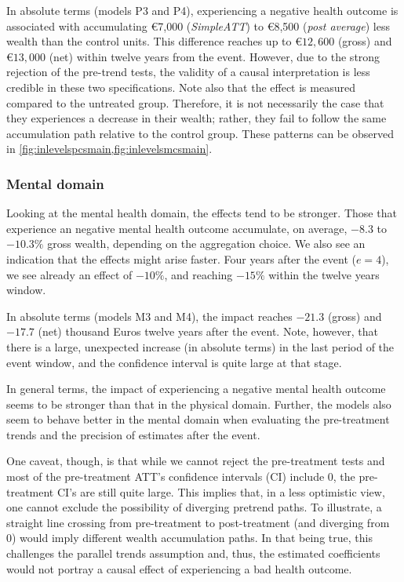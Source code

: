 In absolute terms (models P3 and P4), experiencing a negative health outcome is associated with accumulating
€7,000 (\textit{SimpleATT}) to €8,500 (\textit{post average}) less wealth than the control units.  This
difference reaches up to $€12,600$ (gross) and $€13,000$ (net) within twelve years from the event.
However, due to the strong rejection of the pre-trend tests, the validity of a causal interpretation is less
credible in these two specifications. Note also that the effect is measured compared to the untreated group.
Therefore, it is not necessarily the case that they experiences a decrease in their wealth; rather, they fail
to follow the same accumulation path relative to the control group. These patterns can be observed in
\cref{fig:inlevelspcsmain,fig:inlevelsmcsmain}.

 

\subsubsection{Mental domain}%
%
Looking at the mental health domain, the effects tend to be stronger. Those that experience an negative mental
health outcome accumulate, on average, $-8.3$ to $-10.3\%$ gross wealth, depending on the aggregation choice.
We also see an indication that the effects might arise faster. Four years after the event ($e=4$), we see
already an effect of $-10\%$, and reaching $-15\%$ within the twelve years window.

In absolute terms (models M3 and M4), the impact reaches $-21.3$ (gross) and $-17.7$ (net) thousand Euros
twelve years after the event. Note, however, that there is a large, unexpected increase (in absolute terms) in
the last period of the event window, and the confidence interval is quite large at that stage.

In general terms, the impact of experiencing a negative mental health outcome seems to be stronger than that in
the physical domain. Further, the models also seem to behave better in the mental domain when evaluating 
the pre-treatment trends and the precision of estimates after the event. 

One caveat, though, is that while we cannot reject the pre-treatment tests and most of the pre-treatment ATT's
confidence intervals (CI) include 0, the pre-treatment CI's are still quite large. This implies that, in a less
optimistic view, one cannot exclude the possibility of diverging pretrend paths. To illustrate, a straight line
crossing from pre-treatment to post-treatment (and diverging from 0) would imply different wealth accumulation
paths. In that being true, this challenges the parallel trends assumption and, thus, the estimated coefficients
would not portray a causal effect of experiencing a bad health outcome. %


